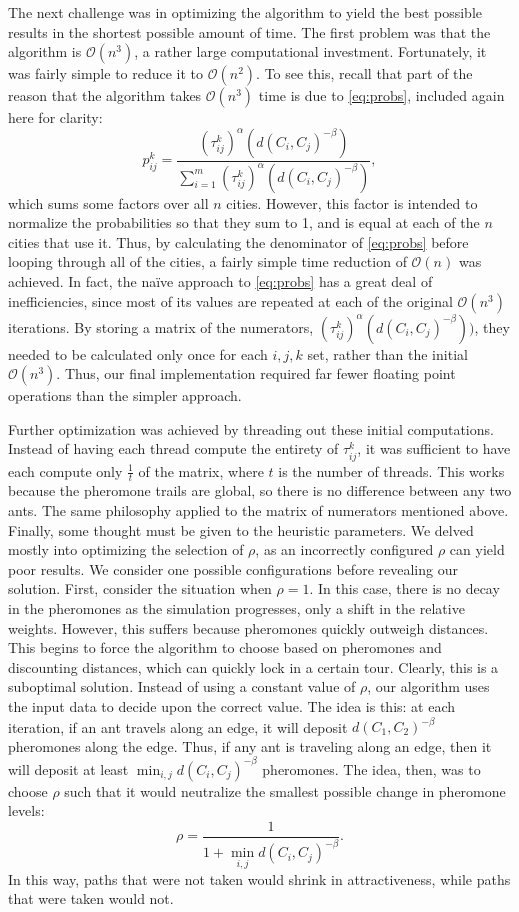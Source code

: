 \documentclass[twocolumn]{article}
\begin{document}
The next challenge was in optimizing the algorithm to yield the best possible
results in the shortest possible amount of time. The first problem was that the
algorithm is $\mathcal{O}(n^3)$, a rather large computational investment. Fortunately,
it was fairly simple to reduce it to $\mathcal{O}(n^2)$. To see this, recall that
part of the reason that 
the algorithm takes $\mathcal{O}(n^3)$ time is due to \eqref{eq:probs}, included again
here for clarity:
\[ p_{ij}^k = \frac{(\tau^k_{ij})^\alpha(d(C_i,C_j)^{-\beta})}{\sum_{i=1}^m 
  (\tau^k_{ij})^\alpha(d(C_i,C_j)^{-\beta})} ,\]
which sums
some factors over all $n$ cities. However, this factor is intended to normalize the
probabilities so that they sum to 1, and is equal at each of the $n$ cities that 
use it. Thus, by calculating the denominator of \eqref{eq:probs} before looping through 
all of the cities, a fairly simple time reduction of $\mathcal{O}(n)$ was achieved. 
In fact, the na\"{i}ve approach to \eqref{eq:probs} has a great deal of inefficiencies,
since most of its values are repeated at each of the original $\mathcal{O}(n^3)$ iterations.
By storing a matrix of the numerators, $(\tau^k_{ij})^\alpha(d(C_i,C_j)^{-\beta}))$, they needed to be
calculated only once for each $i,j,k$ set, rather than the initial $\mathcal{O}(n^3)$. Thus,
our final implementation required far fewer floating point operations than the simpler approach.

Further optimization was achieved by threading out these initial computations. Instead of 
having each thread compute the entirety of $\tau^k_{ij}$, it was sufficient to have each
compute only $\frac{1}{t}$ of the matrix, where $t$ is the number of threads. This works
because the pheromone trails are global, so there is no difference between any two ants.
The same philosophy applied to the matrix of numerators mentioned above. \\

Finally, some thought must be given to the heuristic parameters. We delved mostly into 
optimizing the selection of $\rho$, as an incorrectly configured $\rho$ can yield poor
results. We consider one possible configurations before revealing our solution. First,
consider the situation when $\rho = 1$. In this case, there is no decay in the pheromones
as the simulation progresses, only a shift in the relative weights. However, this suffers
because pheromones quickly outweigh distances. This begins to force the algorithm to
choose based on pheromones and discounting distances, which can quickly lock in a certain 
tour. Clearly, this is a suboptimal solution. Instead of using a constant value of $\rho$,
our algorithm uses the input data to decide upon the correct value. The idea is this: at
each iteration, if an ant travels along an edge, it will deposit $d(C_1,C_2)^{-\beta}$ 
pheromones along the edge. Thus, if any ant is traveling along an edge, then it will deposit
at least $\min_{i,j} d(C_i,C_j)^{-\beta}$ pheromones. The idea, then, was to choose 
$\rho$ such that it would neutralize the smallest possible change in pheromone levels:
\[ \rho = \frac{1}{1+\min_{i,j} d(C_i,C_j)^{-\beta}}. \]
In this way, paths that were not taken would shrink in attractiveness, while paths that
were taken would not. 
\end{document}
